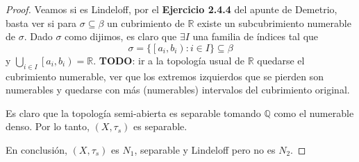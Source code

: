 \documentclass{article}
\theoremstyle{definition}
\newcommand{\R}{\mathbb{R}}
\newcommand{\Q}{\mathbb{Q}}
\newcommand{\coint}[2]{\left[ #1, #2 \right)}
\begin{document}
\begin{proof}
    Veamos si es Lindeloff, por el \textbf{Ejercicio 2.4.4} del apunte de Demetrio, basta ver si para \( \sigma \subseteq \beta \) un cubrimiento de \( \R \) existe un subcubrimiento numerable de \( \sigma \).
    Dado \( \sigma \) como dijimos, es claro que \( \exists I \) una familia de índices tal que \[
        \sigma = \{ \coint{a_i}{b_i} : i \in I \} \subseteq \beta
    \]
    y \( \bigcup_{i \in I} \coint{a_i}{b_i} = \R \). \textbf{TODO}: ir a la topología usual de \( \R \) quedarse el cubrimiento numerable, ver que los extremos izquierdos que se pierden son numerables y quedarse con más (numerables) intervalos del cubrimiento original.


    Es claro que la topología semi-abierta es separable tomando \( \Q \) como el numerable denso. Por lo tanto, \( (X, \tau_s) \) es separable.

    En conclusión, \( (X, \tau_s) \) es \( N_1 \), separable y Lindeloff pero no es \( N_2 \).
\end{proof}
\end{document}
